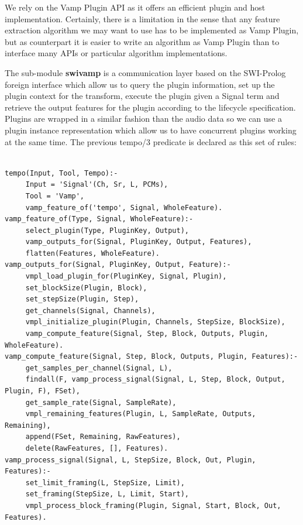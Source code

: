 \documentclass[runningheads]{llncs}
\begin{document}
We rely on the Vamp Plugin API as it offers an efficient plugin and host implementation. Certainly, there is a limitation in the sense that any feature extraction algorithm we may want to use has to be implemented as Vamp Plugin, but as counterpart it is easier to write an algorithm as Vamp Plugin than to interface many APIs or particular algorithm implementations.

The sub-module \textbf{swivamp} is a communication layer based on the SWI-Prolog foreign interface which allow us to query the plugin information, set up the plugin context for the transform, execute the plugin given a Signal term and retrieve the output features for the plugin according to the lifecycle specification. Plugins are wrapped in a similar fashion than the audio data so we can use a plugin instance representation which allow us to have concurrent plugins working at the same time. The previous tempo/3 predicate is declared as this set of rules:

\medskip

\noindent

\begin{verbatim}

tempo(Input, Tool, Tempo):-
     Input = 'Signal'(Ch, Sr, L, PCMs),
     Tool = 'Vamp',
     vamp_feature_of('tempo', Signal, WholeFeature).
vamp_feature_of(Type, Signal, WholeFeature):-
     select_plugin(Type, PluginKey, Output),
     vamp_outputs_for(Signal, PluginKey, Output, Features),
     flatten(Features, WholeFeature).
vamp_outputs_for(Signal, PluginKey, Output, Feature):-
     vmpl_load_plugin_for(PluginKey, Signal, Plugin),
     set_blockSize(Plugin, Block),
     set_stepSize(Plugin, Step),
     get_channels(Signal, Channels),
     vmpl_initialize_plugin(Plugin, Channels, StepSize, BlockSize),
     vamp_compute_feature(Signal, Step, Block, Outputs, Plugin, WholeFeature).
vamp_compute_feature(Signal, Step, Block, Outputs, Plugin, Features):-
     get_samples_per_channel(Signal, L),
     findall(F, vamp_process_signal(Signal, L, Step, Block, Output, Plugin, F), FSet),
     get_sample_rate(Signal, SampleRate),
     vmpl_remaining_features(Plugin, L, SampleRate, Outputs, Remaining),
     append(FSet, Remaining, RawFeatures),
     delete(RawFeatures, [], Features).
vamp_process_signal(Signal, L, StepSize, Block, Out, Plugin, Features):-
     set_limit_framing(L, StepSize, Limit),
     set_framing(StepSize, L, Limit, Start),
     vmpl_process_block_framing(Plugin, Signal, Start, Block, Out, Features).

\end{verbatim}
\noindent
\end{document}
